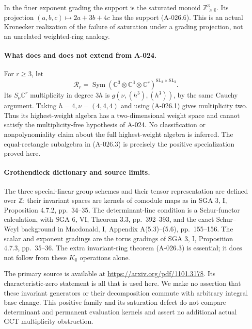 In the finer exponent grading the support is the saturated
monoid $\mathbb Z_{\geq0}^3$. Its projection
$(a,b,c)\mapsto2a+3b+4c$ has the support (A-026.6).
This is an actual Kronecker realization of the failure of
saturation under a grading projection, not an unrelated
weighted-ring analogy.

\paragraph{What does and does not extend from A-024.}
For $r\geq3$, let
\[
       \mathcal R_r=\operatorname{Sym}
             (\mathbb C^3\otimes\mathbb C^3\otimes\mathbb C^r)
                                ^{\mathrm{SL}_3\times\mathrm{SL}_3}.
\]
Its $S_\nu\mathbb C^r$ multiplicity in degree $3h$ is
$g(\nu,(h^3),(h^3))$, by the same Cauchy argument.
Taking $h=4,\nu=(4,4,4)$ and using (A-026.1) gives
multiplicity two. Thus its highest-weight algebra has a
two-dimensional weight space and cannot satisfy the
multiplicity-free hypothesis of A-024. No classification
or nonpolynomiality claim about the full highest-weight
algebra is inferred. The equal-rectangle subalgebra in
(A-026.3) is precisely the positive specialization proved here.

\paragraph{Grothendieck dictionary and source limits.}
The three special-linear group schemes and their tensor
representation are defined over $\mathbb Z$; their invariant
spaces are kernels of comodule maps as in SGA 3, I,
Proposition 4.7.2, pp.~34--35. The determinant-line
condition is a Schur-functor calculation, with SGA 6, VI,
Theorem 3.3, pp.~392--393, and the exact Schur--Weyl
background in Macdonald, I, Appendix A(5.3)--(5.6),
pp.~155--156. The scalar and exponent gradings are the
torus gradings of SGA 3, I, Proposition 4.7.3, pp.~35--36.
The extra invariant-ring theorem (A-026.3) is essential;
it does not follow from these $K_0$ operations alone.

The primary source is available at
\url{https://arxiv.org/pdf/1101.3178}. Its characteristic-zero
statement is all that is used here. We make no assertion
that these invariant generators or their decomposition commute
with arbitrary integral base change. This positive family
and its saturation defect do not compare determinant and
permanent evaluation kernels and assert no additional
actual GCT multiplicity obstruction.
